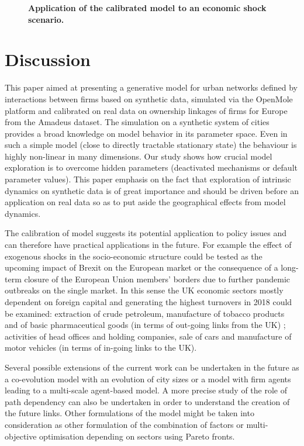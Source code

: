 \documentclass[10pt,letterpaper]{article}
\begin{document}
\begin{figure}
	\begin{center}
    \end{center}
	\caption{\textbf{Application of the calibrated model to an economic shock scenario.}\label{fig:fig9}}
\end{figure}



\section*{Discussion}

This paper aimed at presenting a generative model for urban networks defined by interactions between firms based on synthetic data, simulated via the OpenMole platform and calibrated on real data on ownership linkages of firms for Europe from the Amadeus dataset. The simulation on a synthetic system of cities provides a broad knowledge on model behavior in its parameter space. Even in such a simple model (close to directly tractable stationary state) the behaviour is highly non-linear in many dimensions. Our study shows how crucial model exploration is to overcome hidden parameters (deactivated mechanisms or default parameter values). This paper emphasis on the fact that exploration of intrinsic dynamics on synthetic data is of great importance and should be driven before an application on real data so as to put aside the geographical effects from model dynamics.

The calibration of model suggests its potential application to policy issues and can therefore have practical applications in the future. For example the effect of exogenous shocks in the socio-economic structure could be tested as the upcoming impact of Brexit on the European market or the consequence of a long-term closure of the European Union members' borders due to further pandemic outbreaks on the single market. In this sense the UK economic sectors mostly dependent on foreign capital and generating the highest turnovers in 2018 could be examined: extraction of crude petroleum, manufacture of tobacco products and of basic pharmaceutical goods (in terms of out-going links from the UK) ; activities of head offices and holding companies, sale of cars and manufacture of motor vehicles (in terms of in-going links to the UK).

Several possible extensions of the current work can be undertaken in the future as a co-evolution model with an evolution of city sizes or a model with firm agents leading to a multi-scale agent-based model. A more precise study of the role of path dependency can also be undertaken in order to understand the creation of the future links. Other formulations of the model might be taken into consideration as other formulation of the combination of factors or multi-objective optimisation depending on sectors using Pareto fronts.  
\end{document}
